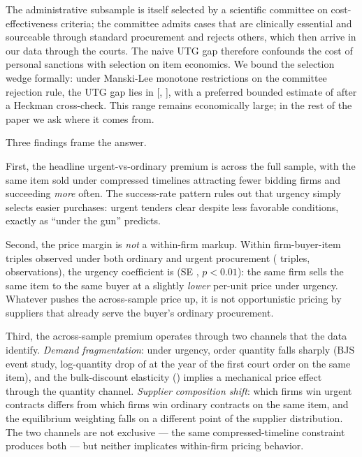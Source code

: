 The administrative subsample is itself selected by a scientific committee
on cost-effectiveness criteria; the committee admits cases that are
clinically essential and sourceable through standard procurement and
rejects others, which then arrive in our data through the courts. The
naive UTG gap therefore confounds the cost of personal sanctions with
selection on item economics. We bound the selection wedge formally: under
Manski-Lee monotone restrictions on the committee rejection rule, the
UTG gap lies in [\BPutgBoundLow{}, \BPutgBoundHigh{}], with a preferred
bounded estimate of \BPutgPointBounded{} after a Heckman cross-check.
This range remains economically large; in the rest of the paper we ask
where it comes from.

Three findings frame the answer.

First, the headline urgent-vs-ordinary premium is \BPnegPctHeadline{}
across the full sample, with the same item sold under compressed
timelines attracting \BPfirmsPctHeadline{} fewer bidding firms and
succeeding \BPsuccessPP{} \emph{more} often. The success-rate pattern
rules out that urgency simply selects easier purchases: urgent tenders
clear despite less favorable conditions, exactly as ``under the gun''
predicts.

Second, the price margin is \emph{not} a within-firm markup. Within
firm-buyer-item triples observed under both ordinary and urgent
procurement (\BPtripleFirmBuyerItemCount{} triples,
\BPtripleFirmBuyerItemN{} observations), the urgency coefficient is
\BPtripleFirmBuyerItemCoef{} (SE \BPtripleFirmBuyerItemSE,
$p<0.01$): the same firm sells the same item to the same buyer at a
slightly \emph{lower} per-unit price under urgency. Whatever pushes the
across-sample price up, it is not opportunistic pricing by suppliers
that already serve the buyer's ordinary procurement.

Third, the across-sample premium operates through two channels that the
data identify. \emph{Demand fragmentation}: under urgency, order quantity
falls sharply (BJS event study, log-quantity drop of
\BPeventQtyDropFirstOrder{} at the year of the first court order on the
same item), and the bulk-discount elasticity (\BPbulkElast) implies a
mechanical price effect through the quantity channel. \emph{Supplier
composition shift}: which firms win urgent contracts differs from which
firms win ordinary contracts on the same item, and the equilibrium
weighting falls on a different point of the supplier distribution. The
two channels are not exclusive --- the same compressed-timeline
constraint produces both --- but neither implicates within-firm pricing
behavior.

